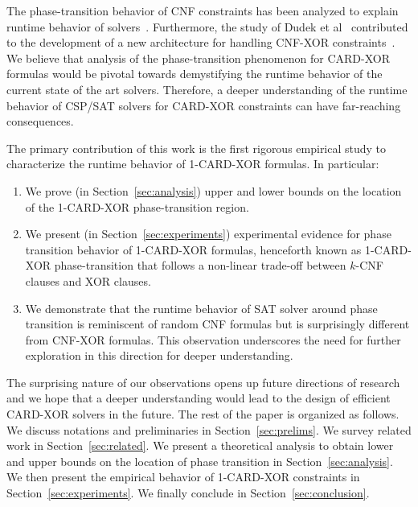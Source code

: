 The phase-transition behavior of CNF constraints has been analyzed to explain runtime behavior of {\SAT} solvers~\cite{AchCoj08}. Furthermore, the study of Dudek et al~ contributed to the development of a new architecture for handling CNF-XOR constraints~\cite{SM19}. We believe that analysis of the phase-transition phenomenon for CARD-XOR formulas would be pivotal  towards demystifying the runtime behavior of the current state of the art solvers.  
Therefore, a deeper understanding of the runtime behavior of CSP/SAT solvers for CARD-XOR constraints can have far-reaching consequences. 


 The primary contribution of this work is the first rigorous empirical study to characterize the runtime behavior of 1-CARD-XOR formulas. In particular:
 \begin{enumerate}
 	\item We prove (in Section~\ref{sec:analysis}) upper and lower bounds on the location of the 1-CARD-XOR  phase-transition region.
 	
 	\item 	We present (in Section~\ref{sec:experiments}) experimental evidence for phase transition behavior of 1-CARD-XOR formulas, henceforth known as 1-CARD-XOR phase-transition that follows a non-linear trade-off between $k$-CNF clauses and XOR clauses.
 	
	\item  We demonstrate that the runtime behavior of SAT solver around phase transition is reminiscent of random CNF formulas but is surprisingly different from CNF-XOR formulas. This observation underscores the need for further exploration in this direction for deeper understanding. 

 	
 	
 \end{enumerate}
 
 The surprising nature of our observations opens up future directions of research and we hope that a deeper understanding would lead to the design of efficient CARD-XOR solvers in the future. The rest of the paper is organized as follows. We discuss notations and preliminaries in Section~\ref{sec:prelims}. We survey related work in Section~\ref{sec:related}. We present a theoretical analysis to obtain lower and upper bounds on the location of phase transition in Section~\ref{sec:analysis}. We then present the empirical behavior of 1-CARD-XOR constraints in Section~\ref{sec:experiments}.  We finally conclude in Section~\ref{sec:conclusion}. 


